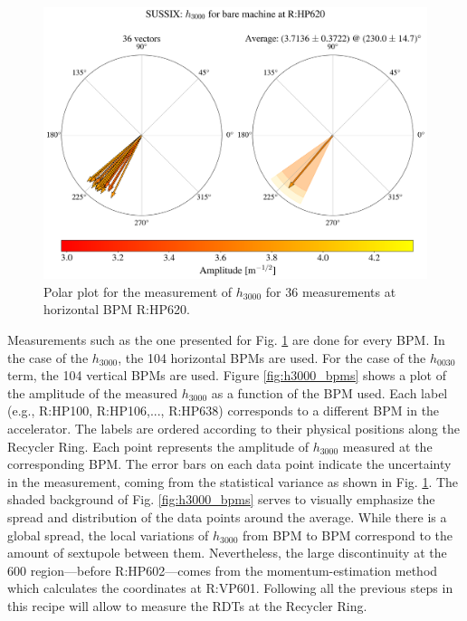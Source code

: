 \begin{figure}[H]
    \centering
    \includegraphics[width=\columnwidth]{chapter4/h3000_RHP620.png}
    \caption{Polar plot for the measurement of $h_{3000}$ for 36 measurements at horizontal BPM R:HP620.}
    \label{fig:h3000_620}
\end{figure}

Measurements such as the one presented for Fig. \ref{fig:h3000_620} are done for every BPM. In the case of the $h_{3000}$, the 104 horizontal BPMs are used. For the case of the $h_{0030}$ term, the 104 vertical BPMs are used. Figure \ref{fig:h3000_bpms} shows a plot of the amplitude of the measured $h_{3000}$ as a function of the BPM used. Each label (e.g., R:HP100, R:HP106,..., R:HP638) corresponds to a different BPM in the accelerator. The labels are ordered according to their physical positions along the Recycler Ring. Each point represents the amplitude of $h_{3000}$ measured at the corresponding BPM. The error bars on each data point indicate the uncertainty in the measurement, coming from the statistical variance as shown in Fig. \ref{fig:h3000_620}. The shaded background of Fig. \ref{fig:h3000_bpms} serves to visually emphasize the spread and distribution of the data points around the average. While there is a global spread, the local variations of $h_{3000}$ from BPM to BPM correspond to the amount of sextupole between them. Nevertheless, the large discontinuity at the 600 region---before R:HP602---comes from the momentum-estimation method which calculates the coordinates at R:VP601. Following all the previous steps in this recipe will allow to measure the RDTs at the Recycler Ring.


